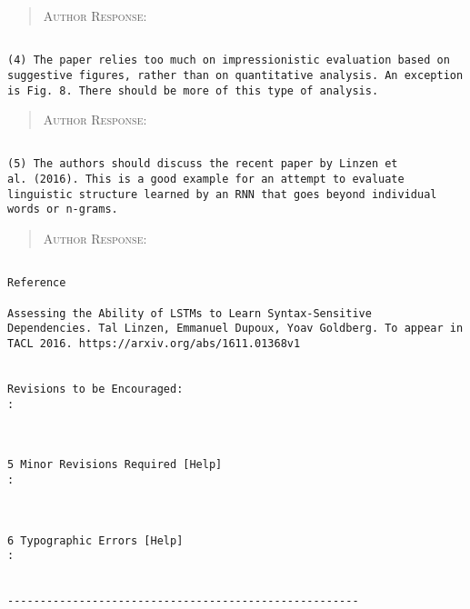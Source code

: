 \begin{quote}
\textsc{Author Response:}  
\end{quote}
\begin{verbatim}

(4) The paper relies too much on impressionistic evaluation based on
suggestive figures, rather than on quantitative analysis. An exception
is Fig. 8. There should be more of this type of analysis.
\end{verbatim}  
\begin{quote}
\textsc{Author Response:}  
\end{quote}
\begin{verbatim}

(5) The authors should discuss the recent paper by Linzen et
al. (2016). This is a good example for an attempt to evaluate
linguistic structure learned by an RNN that goes beyond individual
words or n-grams.
\end{verbatim}  
\begin{quote}
\textsc{Author Response:}  
\end{quote}
\begin{verbatim}

Reference

Assessing the Ability of LSTMs to Learn Syntax-Sensitive
Dependencies. Tal Linzen, Emmanuel Dupoux, Yoav Goldberg. To appear in
TACL 2016. https://arxiv.org/abs/1611.01368v1


Revisions to be Encouraged:
: 



5 Minor Revisions Required [Help]
: 



6 Typographic Errors [Help]
: 


------------------------------------------------------
\end{verbatim}
